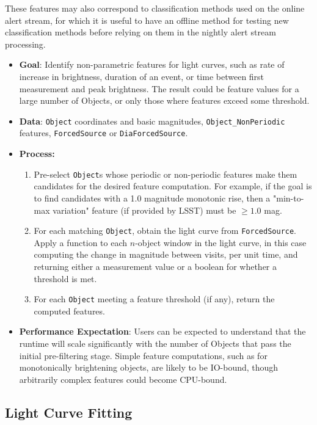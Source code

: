 \documentclass[DM,authoryear,toc]{lsstdoc}
\begin{document}
These features may also correspond to classification methods used on the online
alert stream, for which it is useful to have an offline method for testing new
classification methods before relying on them in the nightly alert stream processing.

\begin{itemize}
  \item \textbf{Goal}: Identify non-parametric features for light curves, such
  as rate of increase in brightness, duration of an event, or time between first
  measurement and peak brightness. The result could be feature values for a
  large number of Objects, or only those where features exceed some threshold.
  \item \textbf{Data}: \texttt{Object} coordinates and basic magnitudes,
  \texttt{Object\_NonPeriodic} features, \texttt{ForcedSource} or \texttt{DiaForcedSource}.
  \item \textbf{Process:}
    \begin{enumerate}
      \item Pre-select \texttt{Object}s whose periodic or non-periodic features
      make them candidates for the desired feature computation. For example, if
      the goal is to find candidates with a 1.0 magnitude monotonic rise, then a
      "min-to-max variation" feature (if provided by LSST) must be $\ge 1.0$ mag.
      \item For each matching \texttt{Object}, obtain the light curve from
      \texttt{ForcedSource}. Apply a function to each $n$-object window in the
      light curve, in this case computing the change in magnitude between
      visits, per unit time, and returning either a measurement value or a
      boolean for whether a threshold is met.
      \item For each \texttt{Object} meeting a feature threshold (if any),
      return the computed features.
    \end{enumerate}
  \item \textbf{Performance Expectation}: Users can be expected to understand
  that the runtime will scale significantly with the number of Objects that pass
  the initial pre-filtering stage. Simple feature computations, such as for
  monotonically brightening objects, are likely to be IO-bound, though
  arbitrarily complex features could become CPU-bound.
\end{itemize}

\subsection{Light Curve Fitting}
\end{document}
